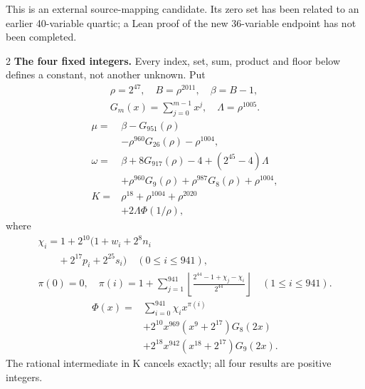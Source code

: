 \documentclass[10pt]{article}
\newcommand{\fl}[1]{\left\lfloor#1\right\rfloor}
\begin{document}
This is an external source-mapping candidate. Its zero set has been related to
an earlier 40-variable quartic; a Lean proof of the new 36-variable endpoint
has not been completed.
\bigskip
\begin{multicols}{2}\fontsize{7.7}{8.2}\selectfont
\textbf{The four fixed integers.}
Every index, set, sum, product and floor below defines a constant, not
another unknown. Put
\[
\begin{gathered}
\rho=2^{47},\quad B=\rho^{2011},\quad\beta=B-1,\\
G_m(x)=\sum_{j=0}^{m-1}x^j,\quad
\Lambda=\rho^{1005}.
\end{gathered}
\]
\begin{align*}
\mu={}&\beta-G_{951}(\rho)\\
&-\rho^{960}G_{26}(\rho)-\rho^{1004},\\
\omega={}&\beta+8G_{917}(\rho)-4+(2^{45}-4)\Lambda\\
&+\rho^{960}G_9(\rho)+\rho^{987}G_8(\rho)
  +\rho^{1004},\\
K={}&\rho^{18}+\rho^{1004}+\rho^{2020}\\
&+2\Lambda\Phi(1/\rho),
\end{align*}
where
\[
\begin{gathered}
\chi_i=1+2^{10}(1+w_i+2^8n_i\\
\qquad+2^{17}p_i+2^{25}s_i)\quad(0\le i\le941),\\
\pi(0)=0,\quad\pi(i)=1+\sum_{j=1}^{941}
\fl{\frac{2^{44}-1+\chi_j-\chi_i}{2^{44}}}\quad(1\le i\le941).
\end{gathered}
\]
\[
\begin{split}
\Phi(x)={}&\sum_{i=0}^{941}\chi_i x^{\pi(i)}\\
&+2^{10}x^{969}(x^9+2^{17})G_8(2x)\\
&+2^{18}x^{942}(x^{18}+2^{17})G_9(2x).
\end{split}
\]
The rational intermediate in K cancels exactly; all four results are positive integers.


\end{multicols}
\end{document}
